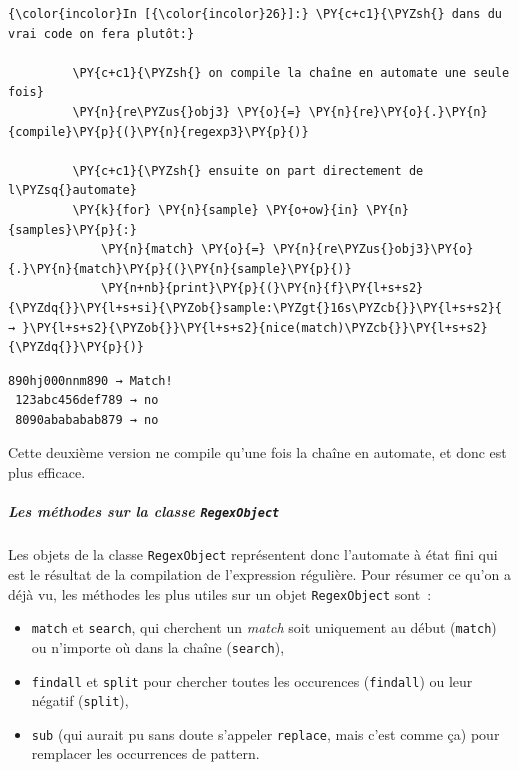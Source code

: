     \begin{Verbatim}[commandchars=\\\{\}]
{\color{incolor}In [{\color{incolor}26}]:} \PY{c+c1}{\PYZsh{} dans du vrai code on fera plutôt:}
         
         \PY{c+c1}{\PYZsh{} on compile la chaîne en automate une seule fois}
         \PY{n}{re\PYZus{}obj3} \PY{o}{=} \PY{n}{re}\PY{o}{.}\PY{n}{compile}\PY{p}{(}\PY{n}{regexp3}\PY{p}{)}
         
         \PY{c+c1}{\PYZsh{} ensuite on part directement de l\PYZsq{}automate}
         \PY{k}{for} \PY{n}{sample} \PY{o+ow}{in} \PY{n}{samples}\PY{p}{:}
             \PY{n}{match} \PY{o}{=} \PY{n}{re\PYZus{}obj3}\PY{o}{.}\PY{n}{match}\PY{p}{(}\PY{n}{sample}\PY{p}{)}
             \PY{n+nb}{print}\PY{p}{(}\PY{n}{f}\PY{l+s+s2}{\PYZdq{}}\PY{l+s+si}{\PYZob{}sample:\PYZgt{}16s\PYZcb{}}\PY{l+s+s2}{ → }\PY{l+s+s2}{\PYZob{}}\PY{l+s+s2}{nice(match)\PYZcb{}}\PY{l+s+s2}{\PYZdq{}}\PY{p}{)}
\end{Verbatim}


    \begin{Verbatim}[commandchars=\\\{\}]
  890hj000nnm890 → Match!
 123abc456def789 → no
 8090abababab879 → no

    \end{Verbatim}

    Cette deuxième version ne compile qu'une fois la chaîne en automate, et
donc est plus efficace.

    \hypertarget{les-muxe9thodes-sur-la-classe-regexobject}{%
\subparagraph{\texorpdfstring{Les méthodes sur la classe
\texttt{RegexObject}}{Les méthodes sur la classe RegexObject}}\label{les-muxe9thodes-sur-la-classe-regexobject}}

    Les objets de la classe \texttt{RegexObject} représentent donc
l'automate à état fini qui est le résultat de la compilation de
l'expression régulière. Pour résumer ce qu'on a déjà vu, les méthodes
les plus utiles sur un objet \texttt{RegexObject} sont~:

\begin{itemize}
	\item 
	\texttt{match} et \texttt{search}, qui cherchent un \emph{match} soit
	uniquement au début (\texttt{match}) ou n'importe où dans la chaîne
	(\texttt{search}),
	\item
	\texttt{findall} et \texttt{split} pour chercher
	toutes les occurences (\texttt{findall}) ou leur négatif
	(\texttt{split}),
	\item
	\texttt{sub} (qui aurait pu sans doute s'appeler
	\texttt{replace}, mais c'est comme ça) pour remplacer les occurrences de
	pattern.
\end{itemize}

